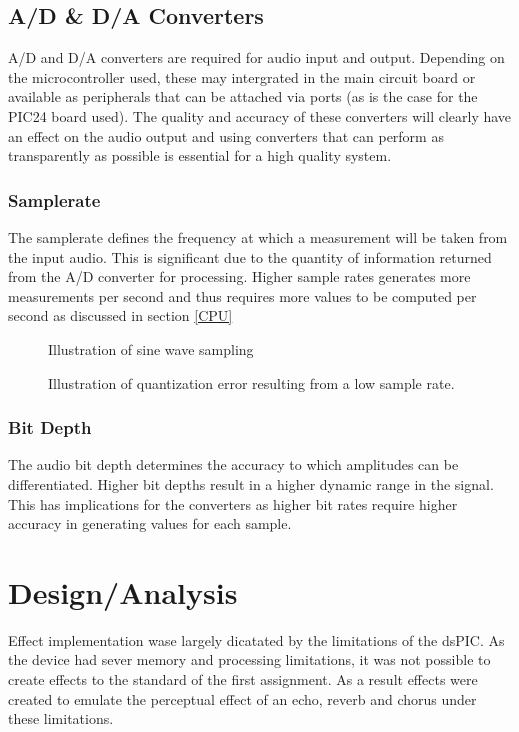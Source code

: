\documentclass[titlepage]{scrartcl}
\begin{document}
    \subsection{A/D \& D/A Converters}
    A/D and D/A converters are required for audio input and output. Depending
    on the microcontroller used, these may intergrated in the main circuit
    board or available as peripherals that can be attached via ports (as is the
    case for the PIC24 board used). The quality and accuracy of these
    converters will clearly have an effect on the audio output and using
    converters that can perform as transparently as possible is essential for a
    high quality system.
    
    \subsubsection{Samplerate}
    The samplerate defines the frequency at which a measurement will be taken
    from the input audio. This is significant due to the quantity of
    information returned from the A/D converter for processing. Higher sample
    rates generates more measurements per second and thus requires more values
    to be computed per second as discussed in section \ref{CPU}
    \begin{figure}[H]
        \caption{Illustration of sine wave sampling}
    \end{figure}
    \begin{figure}[H]
        \caption{Illustration of quantization error resulting from a low sample
        rate.}
    \end{figure}

    \subsubsection{Bit Depth}
    The audio bit depth determines the accuracy to which amplitudes can be
    differentiated. Higher bit depths result in a higher dynamic range in the
    signal. This has implications for the converters as higher bit rates
    require higher accuracy in generating values for each sample.

    \section{Design/Analysis}\label{design}
    Effect implementation wase largely dicatated by the limitations of the
    dsPIC. As the device had sever memory and processing limitations, it was
    not possible to create effects to the standard of the first assignment. As
    a result effects were created to emulate the perceptual effect of an echo,
    reverb and chorus under these limitations.
\end{document}

